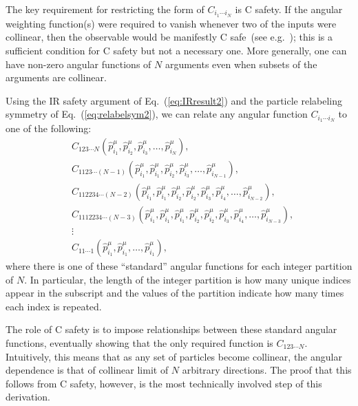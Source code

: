 \documentclass[letterpaper,11pt]{article}
\DeclareRobustCommand{\Eq}[1]{Eq.~(\ref{#1})}
\begin{document}
The key requirement for restricting the form of $C_{i_1\cdots i_N}$ is C safety.
%
If the angular weighting function(s) were required to vanish whenever two of the inputs were collinear, then the observable would be manifestly C safe~(see e.g.\ \cite{Moult:2016cvt}); this is a sufficient condition for C safety but not a necessary one.
%
More generally, one can have non-zero angular functions of $N$ arguments even when subsets of the arguments are collinear.

Using the IR safety argument of \Eq{eq:IRresult2} and the particle relabeling symmetry of \Eq{eq:relabelsym2}, we can relate any angular function $C_{i_1\cdots i_N}$ to one of the following:
\begin{align}\label{eq:Cexample}
&C_{123\cdots N}(\hat p_{i_1}^\mu,\hat p_{i_2}^\mu,\hat p_{i_3}^\mu,\ldots,\hat p_{i_N}^\mu),\nonumber\\
&C_{1123\cdots (N-1)}(\hat p_{i_1}^\mu,\hat p_{i_1}^\mu,\hat p_{i_2}^\mu,\hat p_{i_3}^\mu,\ldots,\hat p_{i_{N-1}}^\mu),\nonumber\\
&C_{112234\cdots (N-2)}(\hat p_{i_1}^\mu,\hat p_{i_1}^\mu,\hat p_{i_2}^\mu,\hat p_{i_2}^\mu,\hat p_{i_3}^\mu,\hat p_{i_4}^\mu,\ldots,\hat p_{i_{N-2}}^\mu),\nonumber\\
&C_{1112234\cdots(N-3)}(\hat p_{i_1}^\mu,\hat p_{i_1}^\mu,\hat p_{i_1}^\mu,\hat p_{i_2}^\mu,\hat p_{i_2}^\mu,\hat p_{i_3}^\mu,\hat p_{i_4}^\mu,\ldots,\hat p_{i_{N-3}}^\mu),\nonumber\\
&\vdots\nonumber\\
&C_{11\cdots 1}(\hat p_{i_1}^\mu,\hat p_{i_1}^\mu,\ldots,\hat p_{i_1}^\mu),
\end{align}
where there is one of these ``standard'' angular functions for each integer partition of $N$.
%
In particular, the length of the integer partition is how many unique indices appear in the subscript and the values of the partition indicate how many times each index is repeated.

The role of C safety is to impose relationships between these standard angular functions, eventually showing that the only required function is $C_{123\cdots N}$.
%
Intuitively, this means that as any set of particles become collinear, the angular dependence is that of collinear limit of $N$ arbitrary directions.
%
The proof that this follows from C safety, however, is the most technically involved step of this derivation.
\end{document}
